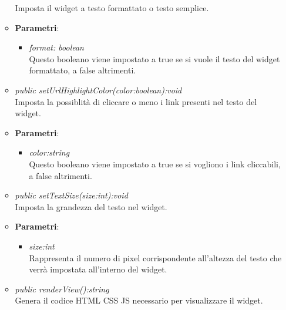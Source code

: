 \begin{itemize}
\begin{itemize}
	Imposta il widget a testo formattato o testo semplice.
		\item{\textbf{Parametri}: \begin{itemize}
		\item \textit{format: boolean}\\
		Questo booleano viene impostato a true se si vuole il testo del widget formattato, a false altrimenti.
		\end{itemize}}
	\item \textit{public setUrlHighlightColor(color:boolean):void}\\
	Imposta la possiblità di cliccare o meno i link presenti nel testo del widget.
		\item{\textbf{Parametri}: \begin{itemize}
		\item \textit{color:string}\\
		Questo booleano viene impostato a true se si vogliono i link cliccabili, a false altrimenti.
		\end{itemize}}
	\item \textit{public setTextSize(size:int):void}\\
	Imposta la grandezza del testo nel widget.
		\item{\textbf{Parametri}: \begin{itemize}
		\item \textit{size:int}\\
		Rappresenta il numero di pixel corrispondente all'altezza del testo che verrà impostata all'interno del widget.
		\end{itemize}}
	\item \textit{public renderView():string}\\
	Genera il codice HTML CSS JS necessario per visualizzare il widget.
	\end{itemize}
\end{itemize}


